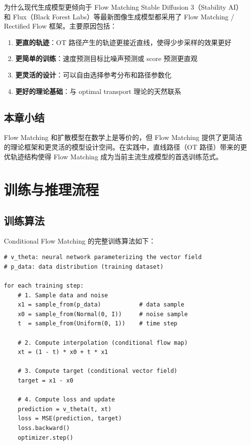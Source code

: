 \documentclass[a4paper]{article}
\begin{document}
\begin{knowledgebox}{为什么现代生成模型更倾向于 Flow Matching}
Stable Diffusion 3（Stability AI）和 Flux（Black Forest Labs）等最新图像生成模型都采用了 Flow Matching / Rectified Flow 框架。主要原因包括：
\begin{enumerate}
    \item \textbf{更直的轨迹}：OT 路径产生的轨迹更接近直线，使得少步采样的效果更好
    \item \textbf{更简单的训练}：速度预测目标比噪声预测或 score 预测更直观
    \item \textbf{更灵活的设计}：可以自由选择参考分布和路径参数化
    \item \textbf{更好的理论基础}：与 optimal transport 理论的天然联系
\end{enumerate}
\end{knowledgebox}

\subsection{本章小结}

Flow Matching 和扩散模型在数学上是等价的，但 Flow Matching 提供了更简洁的理论框架和更灵活的模型设计空间。在实践中，直线路径（OT 路径）带来的更优轨迹结构使得 Flow Matching 成为当前主流生成模型的首选训练范式。


\section{训练与推理流程}

\subsection{训练算法}

Conditional Flow Matching 的完整训练算法如下：

\begin{lstlisting}[caption={Conditional Flow Matching 训练算法（OT 路径）}]
# v_theta: neural network parameterizing the vector field
# p_data: data distribution (training dataset)

for each training step:
    # 1. Sample data and noise
    x1 = sample_from(p_data)           # data sample
    x0 = sample_from(Normal(0, I))     # noise sample
    t  = sample_from(Uniform(0, 1))    # time step

    # 2. Compute interpolation (conditional flow map)
    xt = (1 - t) * x0 + t * x1

    # 3. Compute target (conditional vector field)
    target = x1 - x0

    # 4. Compute loss and update
    prediction = v_theta(t, xt)
    loss = MSE(prediction, target)
    loss.backward()
    optimizer.step()
\end{lstlisting}
\end{document}
